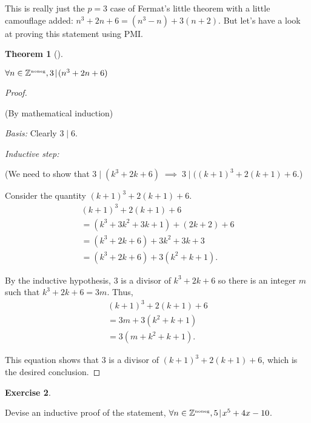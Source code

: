 \documentclass[10pt,]{book}
\theoremstyle{plain}
\newtheorem{theorem}{Theorem}[section]
\theoremstyle{definition}
\theoremstyle{definition}
\newtheorem{exercise}[theorem]{Exercise}
\numberwithin{equation}{section}
\renewcommand{\Naturals}{{\mathbb Z}^{\mbox{\tiny noneg}} }
\newcommand{\divides}{\!\mid\!}
\newcommand{\Naturals}{{\mathbb N}}
\begin{document}
    This is really just the \(p=3\) case of Fermat's little theorem
    with a little camouflage added: \(n^3 + 2n + 6 = (n^3-n)+3(n+2)\).
    But let's have a look at proving this statement using PMI.
\begin{theorem}[{}]\label{theorem-22}

        \(\forall n \in \Naturals,  3 \divides (n^3 + 2n + 6)\)
\end{theorem}
\begin{proof}\hypertarget{proof-34}{}

      (By mathematical induction)
\par

      \emph{Basis:} Clearly \(3 \divides 6\).
\par

      \emph{Inductive step:}
\par

      (We need to show that \(3 \divides (k^3 + 2k + 6) \; \implies \; 3 \divides ((k+1)^3 + 2(k+1) + 6\).)
\par

      Consider the quantity \((k+1)^3 + 2(k+1) + 6\).
      \begin{gather*}
(k+1)^3 + 2(k+1) + 6\\
= (k^3 + 3k^2 + 3k + 1) + (2k + 2) + 6\\
= (k^3 + 2k + 6) + 3k^2 + 3k + 3\\
= (k^3 + 2k + 6) + 3(k^2 + k + 1).
\end{gather*}
\par

      By the inductive hypothesis, 3 is a divisor of \(k^3 + 2k + 6\) so there
      is an integer \(m\) such that \(k^3 + 2k + 6 = 3m\).
      Thus,
      \begin{gather*}
(k+1)^3 + 2(k+1) + 6\\
= 3m + 3(k^2 + k + 1)\\
= 3(m + k^2 + k + 1).
\end{gather*}
\par

      This equation shows that 3 is a divisor of \((k+1)^3 + 2(k+1) + 6\), which
      is the desired conclusion.
\end{proof}
\begin{exercise}\label{exercise-45}

        Devise an inductive proof of the statement, \(\forall n \in \Naturals, 5 \divides x^5+4x-10\).
\end{exercise}
\par
\end{document}
